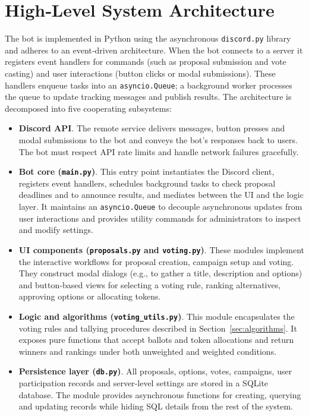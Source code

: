 \section{High‑Level System Architecture}
The bot is implemented in Python using the asynchronous
\texttt{discord.py} library and adheres to an event‑driven architecture.
When the bot connects to a server it registers event handlers for
commands (such as proposal submission and vote casting) and user
interactions (button clicks or modal submissions).  These handlers
enqueue tasks into an \texttt{asyncio.Queue}; a background worker
processes the queue to update tracking messages and publish results.
The architecture is decomposed into five cooperating subsystems:
\begin{itemize}
    \item \textbf{Discord API}.  The remote service delivers
    messages, button presses and modal submissions to the bot and
    conveys the bot’s responses back to users.  The bot must respect
    API rate limits and handle network failures gracefully.
    \item \textbf{Bot core (\texttt{main.py})}.  This entry point
    instantiates the Discord client, registers event handlers, schedules
    background tasks to check proposal deadlines and to announce
    results, and mediates between the UI and the logic
    layer.  It maintains an \texttt{asyncio.Queue} to decouple
    asynchronous updates from user interactions and provides utility
    commands for administrators to inspect and modify settings.
    \item \textbf{UI components (\texttt{proposals.py} and
    \texttt{voting.py})}.  These modules implement the interactive
    workflows for proposal creation, campaign setup and voting.  They
    construct modal dialogs (e.g., to gather a title, description and
    options) and button‑based views for selecting a voting rule,
    ranking alternatives, approving options or allocating tokens.
    \item \textbf{Logic and algorithms (\texttt{voting\_utils.py})}.
    This module encapsulates the voting rules and tallying procedures
    described in Section~\ref{sec:algorithms}.  It exposes pure
    functions that accept ballots and token allocations and return
    winners and rankings under both unweighted and weighted conditions.
    \item \textbf{Persistence layer (\texttt{db.py})}.  All
    proposals, options, votes, campaigns, user participation records
    and server‑level settings are stored in a SQLite database.  The
    module provides asynchronous functions for creating, querying and
    updating records while hiding SQL details from the rest of the
    system.
\end{itemize}


